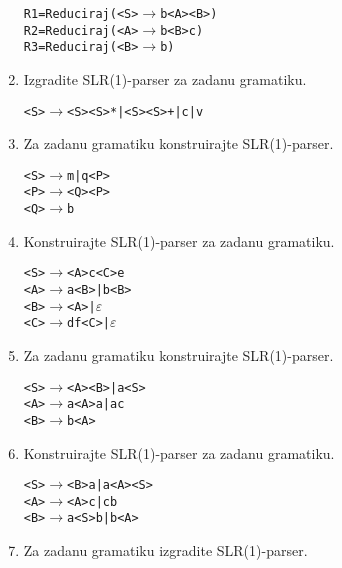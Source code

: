 \documentclass[times, 12pt, utf8]{book}
\begin{document}
\begin{enumerate}[resume]
\begin{alltt}
R1 = Reduciraj ( <S> \(\to\) b <A> <B> )
R2 = Reduciraj ( <A> \(\to\) b <B> c )
R3 = Reduciraj ( <B> \(\to\) b )
\end{alltt}

\item
Izgradite SLR(1)-parser za zadanu gramatiku. \cite[str.~139-147]{udzbenik} \cite{auditorne}

\begin{alltt}
<S> \(\to\) <S><S>* | <S><S>+ | c | v
\end{alltt} 

\item
Za zadanu gramatiku konstruirajte SLR(1)-parser. \cite[str.~139-147]{udzbenik} \cite{auditorne}

\begin{alltt}
<S> \(\to\) m | q<P>
<P> \(\to\) <Q><P>
<Q> \(\to\) b
\end{alltt} 

\item
Konstruirajte SLR(1)-parser za zadanu gramatiku. \cite[str.~139-147]{udzbenik} \cite{auditorne}

\begin{alltt}
<S> \(\to\) <A>c<C>e
<A> \(\to\) a<B> | b<B>
<B> \(\to\) <A> | \(\varepsilon\)
<C> \(\to\) df<C> | \(\varepsilon\)
\end{alltt} 

\item
Za zadanu gramatiku konstruirajte SLR(1)-parser. \cite[str.~139-147]{udzbenik} \cite{auditorne}

\noindent
\begin{alltt}
<S> \(\to\) <A><B> | a<S>
<A> \(\to\) a<A>a | ac
<B> \(\to\) b<A>
\end{alltt} 

\item
Konstruirajte SLR(1)-parser za zadanu gramatiku. \cite[str.~139-147]{udzbenik} \cite{auditorne}

\noindent
\begin{alltt} 
<S> \(\to\) <B>a | a<A><S>
<A> \(\to\) <A>c | cb
<B> \(\to\) a<S>b | b<A>
\end{alltt} 

\item
Za zadanu gramatiku izgradite SLR(1)-parser. \cite[str.~139-147]{udzbenik} \cite{auditorne}


\end{enumerate}
\end{document}

